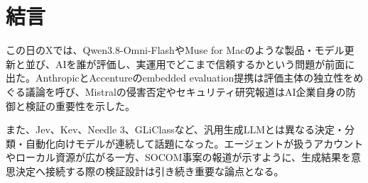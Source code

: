 \section*{結言}
この日のXでは、Qwen3.8-Omni-FlashやMuse for Macのような製品・モデル更新と並び、AIを誰が評価し、実運用でどこまで信頼するかという問題が前面に出た。AnthropicとAccentureのembedded evaluation提携は評価主体の独立性をめぐる議論を呼び、Mistralの侵害否定やセキュリティ研究報道はAI企業自身の防御と検証の重要性を示した。

また、Jev、Kev、Needle 3、GLiClassなど、汎用生成LLMとは異なる決定・分類・自動化向けモデルが連続して話題になった。エージェントが扱うアカウントやローカル資源が広がる一方、SOCOM事案の報道が示すように、生成結果を意思決定へ接続する際の検証設計は引き続き重要な論点となる。
